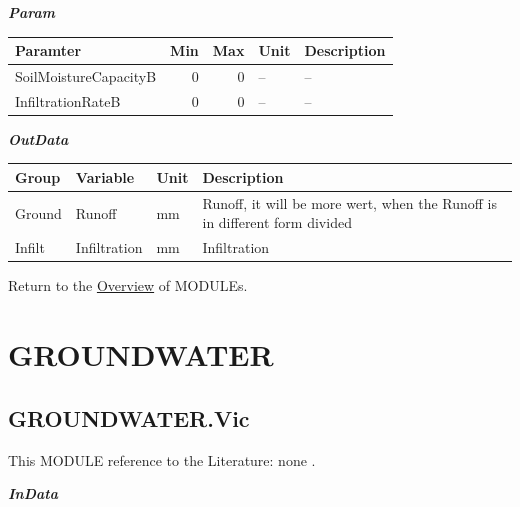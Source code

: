 \documentclass[
]{book}
\begin{document}
\textbf{\emph{Param}}

\begin{table}[!h]
\centering
\begin{tabular}{l|r|r|l|l}
\hline
Paramter & Min & Max & Unit & Description\\
\hline
SoilMoistureCapacityB & 0 & 0 & -- & --\\
\cline{1-5}
InfiltrationRateB & 0 & 0 & -- & --\\
\hline
\end{tabular}
\end{table}

\textbf{\emph{OutData}}

\begin{table}[!h]
\centering
\begin{tabular}{l|l|l|l}
\hline
Group & Variable & Unit & Description\\
\hline
Ground & Runoff & mm & Runoff, it will be more wert, when the Runoff is in different form divided\\
\cline{1-4}
Infilt & Infiltration & mm & Infiltration\\
\hline
\end{tabular}
\end{table}

Return to the \protect\hyperlink{module}{Overview} of MODULEs.

\hypertarget{GROUNDWATER}{%
\section{GROUNDWATER}\label{GROUNDWATER}}

\hypertarget{GROUNDWATER.Vic}{%
\subsection{GROUNDWATER.Vic}\label{GROUNDWATER.Vic}}

This MODULE reference to the Literature: none \citep{none}.

\textbf{\emph{InData}}
\end{document}
